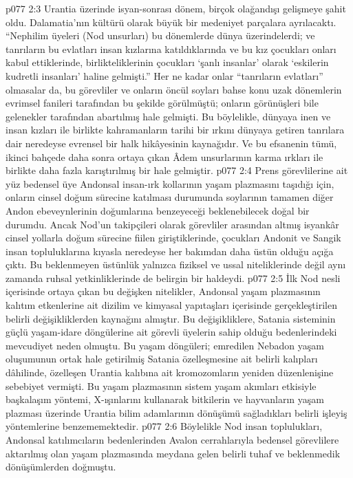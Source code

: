 \vs p077 2:3 Urantia üzerinde isyan\hyp{}sonrası dönem, birçok olağandışı gelişmeye şahit oldu. Dalamatia’nın kültürü olarak büyük bir medeniyet parçalara ayrılacaktı. “Nephilim üyeleri (Nod unsurları) bu dönemlerde dünya üzerindelerdi; ve tanrıların bu evlatları insan kızlarına katıldıklarında ve bu kız çocukları onları kabul ettiklerinde, birlikteliklerinin çocukları ‘şanlı insanlar’ olarak ‘eskilerin kudretli insanları’ haline gelmişti.” Her ne kadar onlar “tanrıların evlatları” olmasalar da, bu görevliler ve onların öncül soyları bahse konu uzak dönemlerin evrimsel fanileri tarafından bu şekilde görülmüştü; onların görünüşleri bile gelenekler tarafından abartılmış hale gelmişti. Bu böylelikle, dünyaya inen ve insan kızları ile birlikte kahramanların tarihi bir ırkını dünyaya getiren tanrılara dair neredeyse evrensel bir halk hikâyesinin kaynağıdır. Ve bu efsanenin tümü, ikinci bahçede daha sonra ortaya çıkan Âdem unsurlarının karma ırkları ile birlikte daha fazla karıştırılmış bir hale gelmiştir.
\vs p077 2:4 Prens görevlilerine ait yüz bedensel üye Andonsal insan\hyp{}ırk kollarının yaşam plazmasını taşıdığı için, onların cinsel doğum sürecine katılması durumunda soylarının tamamen diğer Andon ebeveynlerinin doğumlarına benzeyeceği beklenebilecek doğal bir durumdu. Ancak Nod’un takipçileri olarak görevliler arasından altmış isyankâr cinsel yollarla doğum sürecine fiilen giriştiklerinde, çocukları Andonit ve Sangik insan topluluklarına kıyasla neredeyse her bakımdan daha üstün olduğu açığa çıktı. Bu beklenmeyen üstünlük yalnızca fiziksel ve ussal niteliklerinde değil aynı zamanda ruhsal yetkinliklerinde de belirgin bir haldeydi.
\vs p077 2:5 İlk Nod nesli içerisinde ortaya çıkan bu değişken nitelikler, Andonsal yaşam plazmasının kalıtım etkenlerine ait dizilim ve kimyasal yapıtaşları içerisinde gerçekleştirilen belirli değişikliklerden kaynağını almıştır. Bu değişikliklere, Satania sisteminin güçlü yaşam\hyp{}idare döngülerine ait görevli üyelerin sahip olduğu bedenlerindeki mevcudiyet neden olmuştu. Bu yaşam döngüleri; emredilen Nebadon yaşam oluşumunun ortak hale getirilmiş Satania özelleşmesine ait belirli kalıpları dâhilinde, özelleşen Urantia kalıbına ait kromozomların yeniden düzenlenişine sebebiyet vermişti. Bu yaşam plazmasının sistem yaşam akımları etkisiyle başkalaşım yöntemi, X\hyp{}ışınlarını kullanarak bitkilerin ve hayvanların yaşam plazması üzerinde Urantia bilim adamlarının dönüşümü sağladıkları belirli işleyiş yöntemlerine benzememektedir.
\vs p077 2:6 Böylelikle Nod insan toplulukları, Andonsal katılımcıların bedenlerinden Avalon cerrahlarıyla bedensel görevlilere aktarılmış olan yaşam plazmasında meydana gelen belirli tuhaf ve beklenmedik dönüşümlerden doğmuştu.
